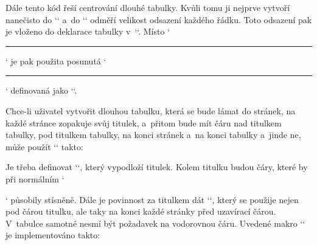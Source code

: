 Dále tento kód řeší centrování dlouhé tabulky. Kvůli tomu ji nejprve vytvoří nanečisto do `` a~do `\tmpdim` odměří velikost odsazení každého řádku. Toto odsazení pak je vloženo do deklarace tabulky v~`\tabdata`. Místo `\hrule` je pak použita posunutá `\hrule` definovaná jako `\ltrule`. 


 


Chce-li uživatel vytvořit dlouhou tabulku, která se bude lámat do stránek, na každé stránce zopakuje svůj titulek, a~přitom bude mít čáru nad titulkem tabulky, pod titulkem tabulky, na konci stránek a~na konci tabulky a~jinde ne, může použít `\longtableT` takto: 

\begtt
\def\strutT {\vrule height1.1em depth.8em width0pt} %
\endtt


Je třeba definovat `\strutT`, který vypodloží titulek. Kolem titulku budou čáry, které by při normálním `\strut` působily stísněně. Dále je povinnost za titulkem dát `\tskip`, který se použije nejen pod čárou titulku, ale taky na konci každé stránky před uzavírací čárou. V~tabulce samotné nesmí být požadavek na vodorovnou čáru. Uvedené makro `\longtableT` je implementováno takto: 

\begtt
\def\longtableT#1#2{\goodbreak \bgroup \setbox0=\table{#1}{\strutT\relax#2} 
   \setbox1=\vbox{\unvbox0 \setbox2=\vbox{}\revertbox} 
   \setbox2=\vbox{\unvbox2 \global\setbox4=\lastbox\unskip \global\setbox5=\lastbox\unskip} 
   \whatfree4 \advance\tmpdim by-.8pt \ifdim\tmpdim<\baselineskip \vfil\break \fi 
   \offinterlineskip \crule\center4\crule\center5 \printboxes 
   \center5\crule \egroup \goodbreak 
} 
\def\whatfree#1{\tmpdim=\vsize \advance\tmpdim by-\pagetotal 
   \advance\tmpdim by-\prevdepth \advance\tmpdim by-.4pt 
   \advance\tmpdim by-\ht#1 \advance\tmpdim by-\dp#1 \advance\tmpdim by-\ht5 } 
\def\revertbox {\setbox0=\lastbox\unskip 
   \ifvoid0 \else \global\setbox2=\vbox{\unvbox2\box0} \revertbox\fi } 
\def\printboxes{\setbox2=\vbox{\unvbox2 \global\setbox0=\lastbox\unskip} 
   \ifvoid0 \else \whatfree0 
      \ifdim\tmpdim<0pt \center5\crule\vfil\break \crule\center4\crule\center5 \fi 
      \center0 \nobreak \printboxes \fi } 
\def\crule{\centerline{\hbox to\wd4{\hrulefill}}\nobreak} 
\def\center#1{\centerline{\copy#1}\nobreak} 
\endtt


